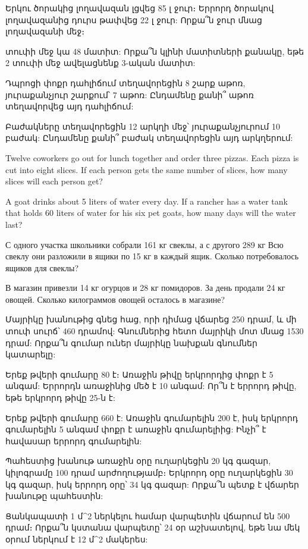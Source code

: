 \textproblem Երկու ծորակից լողավազան լցվեց 85 լ ջուր։ 
Երրորդ ծորակով լողավազանից դուրս թափվեց 22 լ ջուր: Որքա՞ն 
ջուր մնաց լողավազանի մեջ։

 տուփի մեջ կա 48 մատիտ: Որքա՞ն կլինի 
մատիտների քանակը, եթե 2 տուփի մեջ ավելացնենք 3-ական 
մատիտ:

\textproblem Դպրոցի փոքր դահլիճում տեղավորեցին 8 շարք 
աթոռ, յուրաքանչյուր շարքում՝ 7 աթոռ: Ընդամենը քանի՞ աթոռ 
տեղավորվեց այդ դահլիճում:

\textproblem Բաժակները տեղավորեցին 12 արկղի մեջ՝ 
յուրաքանչյուրում 10 բաժակ: Ընդամենը քանի՞ բաժակ 
տեղավորեցին այդ արկղերում:

\textproblem Twelve coworkers go out for lunch together 
and order three pizzas. Each pizza is cut into eight 
slices. If each person gets the same number of slices, 
how many slices will each person get?

\textproblem A goat drinks about 5 liters of water every 
day. If a rancher has a water tank that holds 60 liters 
of water for his six pet goats, how many days will the 
water last?

\textproblem С одного участка школьники собрали 161 кг
свеклы, а с другого 289 кг Всю свеклу они разложили в
ящики по 15 кг в каждый ящик. Сколько потребовалось
ящиков для свеклы?

\textproblem В магазин привезли 14 кг огурцов и
28 кг помидоров. За день продали 24 кг овощей.
Сколько килограммов овощей  осталось в магазине?

\textproblem Մայրիկը խանութից գնեց հաց, որի դիմաց 
վճարեց 250 դրամ, և մի տուփ սուրճ՝ 460 դրամով: 
Գնումներից հետո մայրիկի մոտ մնաց 1530 դրամ: Որքա՞ն 
գումար ուներ մայրիկը նախքան գնումներ կատարելը:

\textproblem Երեք թվերի գումարը 80 է։ Առաջին թիվը 
երկրորդից փոքր է 5 անգամ: Երրորդն առաջինից մեծ է 10 
անգամ: Որ՞ն է երրորդ թիվը, եթե երկրորդ թիվը 25-ն է:

\textproblem Երեք թվերի գումարը 660 է: Առաջին գումարելին 
200 է, իսկ երկրորդ գումարելին 5 անգամ փոքր է առաջին 
գումարելիից: Ինչի՞ է հավասար երրորդ գումարելին:

\textproblem Պահեստից խանութ առաջին օրը ուղարկեցին 
20 կգ գազար, կիլոգրամը 100 դրամ արժողությամբ։ Երկրորդ 
օրը ուղարկեցին 30 կգ գազար, իսկ երրորդ օրը՝ 34 կգ 
գազար: Որքա՞ն պետք է վճարեր խանութը պահեստին:

\textproblem Ցանկապատի 1 մ^2 ներկելու համար վարպետին
վճարում են 500 դրամ։ Որքա՞ն կստանա վարպետը՝ 24 օր աշխատելով,
եթե նա մեկ օրում ներկում է 12 մ^2 մակերես:

